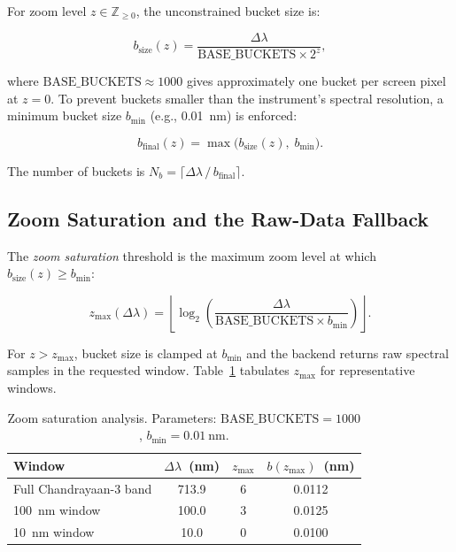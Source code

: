 \documentclass[a4paper,twocolumn,10pt]{article}
\begin{document}
For zoom level $z \in \mathbb{Z}_{\geq 0}$, the unconstrained
bucket size is:

\begin{equation}
\label{eq:bsize}
b_{\text{size}}(z) =
  \frac{\Delta\lambda}{\text{BASE\_BUCKETS} \times 2^z},
\end{equation}

where $\text{BASE\_BUCKETS} \approx 1000$ gives approximately one
bucket per screen pixel at $z = 0$.  To prevent buckets smaller than
the instrument's spectral resolution, a minimum bucket size
$b_{\min}$ (e.g., \SI{0.01}{\nano\metre}) is enforced:

\begin{equation}
\label{eq:bfinal}
b_{\text{final}}(z) = \max\!\bigl(b_{\text{size}}(z),\; b_{\min}\bigr).
\end{equation}

The number of buckets is
$N_b = \lceil \Delta\lambda \,/\, b_{\text{final}} \rceil$.

\subsection{Zoom Saturation and the Raw-Data Fallback}

The \emph{zoom saturation} threshold is the maximum zoom level at
which $b_{\text{size}}(z) \geq b_{\min}$:

\begin{equation}
\label{eq:zmax}
z_{\max}(\Delta\lambda) =
  \left\lfloor \log_2\!\left(
    \frac{\Delta\lambda}{\text{BASE\_BUCKETS} \times b_{\min}}
  \right)\right\rfloor.
\end{equation}

For $z > z_{\max}$, bucket size is clamped at $b_{\min}$ and the
backend returns raw spectral samples in the requested window.
Table~\ref{tab:zmax} tabulates $z_{\max}$ for representative windows.

\begin{table}[htbp]
\centering
\caption{Zoom saturation analysis.  Parameters:
  $\text{BASE\_BUCKETS} = 1000$, $b_{\min} = \SI{0.01}{\nano\metre}$.}
\label{tab:zmax}
\begin{tabularx}{\columnwidth}{X c c c}
\toprule
\textbf{Window} & $\Delta\lambda$~(nm) & $z_{\max}$ & $b(z_{\max})$~(nm) \\
\midrule
Full Chandrayaan-3 band & 713.9 & 6 & 0.0112 \\
100~nm window           & 100.0 & 3 & 0.0125 \\
10~nm window            & 10.0  & 0 & 0.0100 \\
\bottomrule
\end{tabularx}
\end{table}
\end{document}
